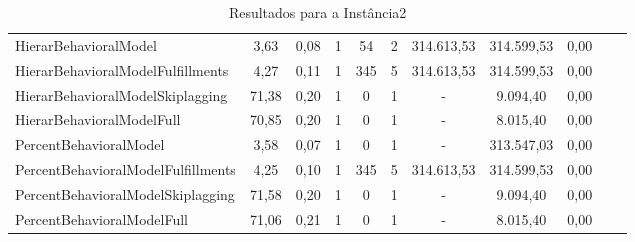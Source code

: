 \begin{table}[h!]
{\begin{tabular}{lcccccccccc}
			HierarBehavioralModel                                                       & 3,63  & 0,08 & 1 & 54  & 2 & 314.613,53 & 314.599,53 & 0,00 \\
			HierarBehavioralModelFulfillments                                           & 4,27  & 0,11 & 1 & 345 & 5 & 314.613,53 & 314.599,53 & 0,00 \\
			HierarBehavioralModelSkiplagging                                            & 71,38 & 0,20 & 1 & 0   & 1 & -          & 9.094,40   & 0,00 \\
			HierarBehavioralModelFull                                                   & 70,85 & 0,20 & 1 & 0   & 1 & -          & 8.015,40   & 0,00 \\ \hline
			PercentBehavioralModel                                                      & 3,58  & 0,07 & 1 & 0   & 1 & -          & 313.547,03 & 0,00 \\
			PercentBehavioralModelFulfillments                                          & 4,25  & 0,10 & 1 & 345 & 5 & 314.613,53 & 314.599,53 & 0,00 \\
			PercentBehavioralModelSkiplagging                                           & 71,58 & 0,20 & 1 & 0   & 1 & -          & 9.094,40   & 0,00 \\
			PercentBehavioralModelFull                                                  & 71,06 & 0,21 & 1 & 0   & 1 & -          & 8.015,40   & 0,00 \\ \hline
		\end{tabular}%
	}
	\caption{Resultados para a Instância2}
	\label{tab:resul_instan2}
\end{table}


